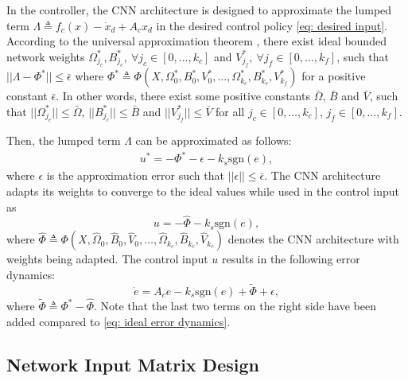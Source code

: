 \documentclass[letterpaper, 10 pt, conference]{ieeeconf}  %
\begin{document}
In the controller, the CNN architecture is designed to approximate the lumped term 
$\Lambda\triangleq f_c(x)-\dot x_d+A_cx_d$ in the desired control policy \eqref{eq: desired input}.
According to the universal approximation theorem \cite{UnivCNN}, there exist ideal bounded network weights
$\Omega^*_{j_c},B^*_{j_c},\ \forall j_{c}\in [0,\dots,k_c]$ and $V^*_{j_f},\ \forall j_f\in [0,\dots,k_f]$, 
such that $||\Lambda- \Phi^*|| \le \bar \epsilon$
where $\Phi^*\triangleq \Phi(X,\Omega_0^*,B_0^*,V_0^*,\dots,\Omega_{k_c}^*,B_{k_c}^*,V_{k_f}^*)$ for a positive constant $\bar\epsilon$. In other words, there exist some positive constants $\bar\Omega$, $\bar B$ and $\bar V$, such that $||\Omega^*_{j_c}||\le \bar\Omega$, $|| B^*_{j_c}||\le \bar B$ and $|| V^*_{j_f}||\le \bar V$ for all $j_c\in[0,\dots,k_c]$, $j_f\in[0,\dots,k_f]$.

Then, the lumped term $\Lambda$ can be approximated as follows:
\begin{align}        
    u^* = -\Phi^* -\epsilon -k_s\text{sgn}(e),
\end{align}
where $\epsilon$ is the approximation error such that $||\epsilon||\le\bar\epsilon$.  
The CNN architecture adapts its weights to converge to the ideal values while used in the control input as 
\begin{equation}
u = -\hat\Phi - k_s\text{sgn}(e), \label{eq: proposed ctrl}
\end{equation}
where $\hat\Phi\triangleq \Phi(X,\hat\Omega_0,\hat B_0,\hat V_0,\dots,\hat\Omega_{k_c},\hat B_{k_c},\hat V_{k_c})$ denotes the CNN architecture with weights being adapted.
The control input $u$ results in the following error dynamics:
\begin{equation}
    \dot e = A_c e-k_s\text{sgn}(e)+\tilde \Phi +\epsilon,
    \label{eq: error dynamics with NN error}
\end{equation}
where $\tilde\Phi\triangleq \Phi^*-\hat\Phi$. Note that the last two terms on the right side have been added compared to \eqref{eq: ideal error dynamics}.

\subsection{Network Input Matrix Design}
\end{document}

